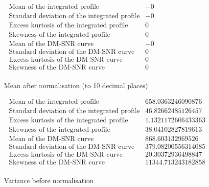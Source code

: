 \documentclass[a4paper,12pt]{article}
\begin{document}
    \begin{figure}[ht!]
        \begin{math}
            \begin{array}{lcr}
                \mbox{ Mean of the integrated profile} & -0 \\
                \mbox{ Standard deviation of the integrated profile} & -0 \\
                \mbox{ Excess kurtosis of the integrated profile} & 0 \\
                \mbox{ Skewness of the integrated profile} & 0 \\
                \mbox{ Mean of the DM-SNR curve} & -0 \\
                \mbox{ Standard deviation of the DM-SNR curve} & 0 \\
                \mbox{ Excess kurtosis of the DM-SNR curve} & 0 \\
                \mbox{ Skewness of the DM-SNR curve} & 0 \\
            \end{array}
        \end{math}
        \caption{Mean after normalisation (to 10 decimal places)}
    \end{figure}

    \begin{figure}[ht!]
        \begin{math}
            \begin{array}{lcr}
                \mbox{ Mean of the integrated profile} & 658.0363246090876 \\
                \mbox{ Standard deviation of the integrated profile} & 46.82662485126457 \\
                \mbox{ Excess kurtosis of the integrated profile} & 1.1321172606433363 \\
                \mbox{ Skewness of the integrated profile} & 38.04102827819613 \\
                \mbox{ Mean of the DM-SNR curve} & 868.603132969526 \\
                \mbox{ Standard deviation of the DM-SNR curve} & 379.08200556314085 \\
                \mbox{ Excess kurtosis of the DM-SNR curve} & 20.30372936498847 \\
                \mbox{ Skewness of the DM-SNR curve} & 11344.713243182858 \\
            \end{array}
        \end{math}
        \caption{Variance before normalisation}
    \end{figure}
\end{document}
